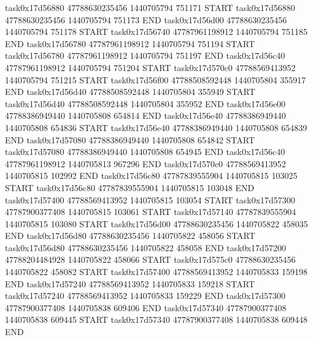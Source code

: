 task0x17d56880 47788630235456          1440705794               751171  START
task0x17d56880 47788630235456          1440705794               751173  END
task0x17d56d00 47788630235456          1440705794               751178  START
task0x17d56740 47787961198912          1440705794               751185  END
task0x17d56780 47787961198912          1440705794               751194  START
task0x17d56780 47787961198912          1440705794               751197  END
task0x17d56c40 47787961198912          1440705794               751204  START
task0x17d570c0 47788569413952          1440705794               751215  START
task0x17d56f00 47788508592448          1440705804               355917  END
task0x17d56d40 47788508592448          1440705804               355949  START
task0x17d56d40 47788508592448          1440705804               355952  END
task0x17d56e00 47788386949440          1440705808               654814  END
task0x17d56e40 47788386949440          1440705808               654836  START
task0x17d56e40 47788386949440          1440705808               654839  END
task0x17d57080 47788386949440          1440705808               654842  START
task0x17d57080 47788386949440          1440705808               654945  END
task0x17d56c40 47787961198912          1440705813               967296  END
task0x17d570c0 47788569413952          1440705815               102992  END
task0x17d56c80 47787839555904          1440705815               103025  START
task0x17d56c80 47787839555904          1440705815               103048  END
task0x17d57400 47788569413952          1440705815               103054  START
task0x17d57300 47787900377408          1440705815               103061  START
task0x17d57140 47787839555904          1440705815               103080  START
task0x17d56d00 47788630235456          1440705822               458035  END
task0x17d56d80 47788630235456          1440705822               458056  START
task0x17d56d80 47788630235456          1440705822               458058  END
task0x17d57200 47788204484928          1440705822               458066  START
task0x17d575c0 47788630235456          1440705822               458082  START
task0x17d57400 47788569413952          1440705833               159198  END
task0x17d57240 47788569413952          1440705833               159218  START
task0x17d57240 47788569413952          1440705833               159229  END
task0x17d57300 47787900377408          1440705838               609406  END
task0x17d57340 47787900377408          1440705838               609445  START
task0x17d57340 47787900377408          1440705838               609448  END
